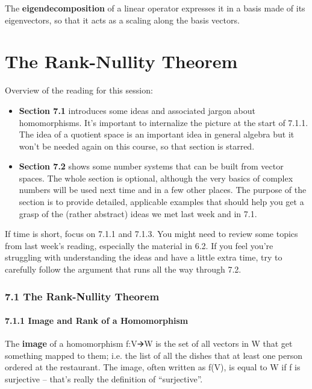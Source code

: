 \documentclass[oneside,english]{amsbook}
\numberwithin{section}{chapter}
\theoremstyle{plain}
\theoremstyle{definition}
\begin{document}
The \textbf{eigendecomposition} of a linear operator expresses it in a
basis made of its eigenvectors, so that it acts as a scaling along the
basis vectors.

\chapter{The Rank-Nullity Theorem}

Overview of the reading for this session:

\begin{itemize}
	\item
	\textbf{Section 7.1} introduces some ideas and associated jargon about
	homomorphisms. It's important to internalize the picture at the start
	of 7.1.1. The idea of a quotient space is an important idea in general
	algebra but it won't be needed again on this course, so that section
	is starred.
	\item
	\textbf{Section 7.2} shows some number systems that can be built from
	vector spaces. The whole section is optional, although the very basics
	of complex numbers will be used next time and in a few other places.
	The purpose of the section is to provide detailed, applicable examples
	that should help you get a grasp of the (rather abstract) ideas we met
	last week and in 7.1.
\end{itemize}

If time is short, focus on 7.1.1 and 7.1.3. You might need to review
some topics from last week's reading, especially the material in 6.2. If
you feel you're struggling with understanding the ideas and have a
little extra time, try to carefully follow the argument that runs all
the way through 7.2.

\subsection{7.1 The Rank-Nullity
	Theorem}\label{the-rank-nullity-theorem-1}

\subsubsection{7.1.1 Image and Rank of a
	Homomorphism}\label{image-and-rank-of-a-homomorphism}

The \textbf{image} of a homomorphism f:V🡪W is the set of all vectors in
W that get something mapped to them; i.e. the list of all the dishes
that at least one person ordered at the restaurant. The image, often
written as f(V), is equal to W if f is surjective -- that's really the
definition of ``surjective''.
\end{document}
